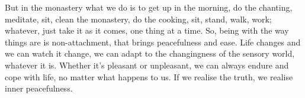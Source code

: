 But in the monastery what we do is to get up in the morning, do the chanting, meditate, sit, clean the monastery, do the cooking, sit, stand, walk, work; whatever, just take it as it comes, one thing at a time. So, being with the way things are is non-attachment, that brings peacefulness and ease. Life changes and we can watch it change, we can adapt to the changingness of the sensory world, whatever it is. Whether it's pleasant or unpleasant, we can always endure and cope with life, no matter what happens to us. If we realise the truth, we realise inner peacefulness.

